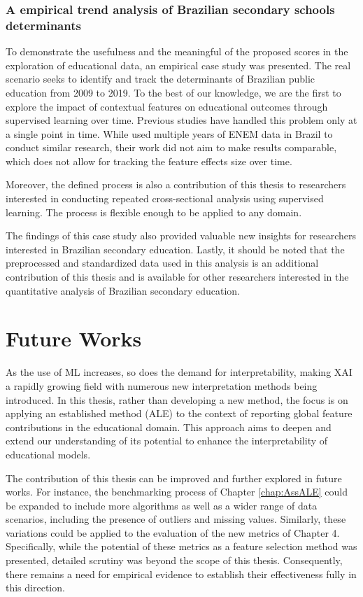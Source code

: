 \subsubsection{A empirical trend analysis of Brazilian secondary schools determinants}

To demonstrate the usefulness and the meaningful of the proposed scores in the exploration of educational data, an empirical case study was presented. The real scenario seeks to identify and track the determinants of Brazilian public education from 2009 to 2019. To the best of our knowledge, we are the first to explore the impact of contextual features on educational outcomes through supervised learning over time. Previous studies have handled this problem only at a single point in time. While \cite{Franco2020UsandoAnos} used multiple years of ENEM data in Brazil to conduct similar research, their work did not aim to make results comparable, which does not allow for tracking the feature effects size over time.

Moreover, the defined process is also a contribution of this thesis to researchers interested in conducting repeated cross-sectional analysis using supervised learning. The process is flexible enough to be applied to any domain. 

The findings of this case study also provided valuable new insights for researchers interested in Brazilian secondary education. Lastly, it should be noted that the preprocessed and standardized data used in this analysis is an additional contribution of this thesis and is available \cite{SilvaFilho2022EnemCensus2009-2019} for other researchers interested in the quantitative analysis of Brazilian secondary education.
  

\section{Future Works}

As the use of ML increases, so does the demand for interpretability, making XAI a rapidly growing field with numerous new interpretation methods being introduced. In this thesis, rather than developing a new method, the focus is on applying an established method (ALE) to the context of reporting global feature contributions in the educational domain. This approach aims to deepen and extend our understanding of its potential to enhance the interpretability of educational models.

The contribution of this thesis can be improved and further explored in future works. For instance, the benchmarking process of Chapter \ref{chap:AssALE} could be expanded to include more algorithms as well as a wider range of data scenarios, including the presence of outliers and missing values. Similarly, these variations could be applied to the evaluation of the new metrics of Chapter 4. Specifically, while the potential of these metrics as a feature selection method was presented, detailed scrutiny was beyond the scope of this thesis. Consequently, there remains a need for empirical evidence to establish their effectiveness fully in this direction.

